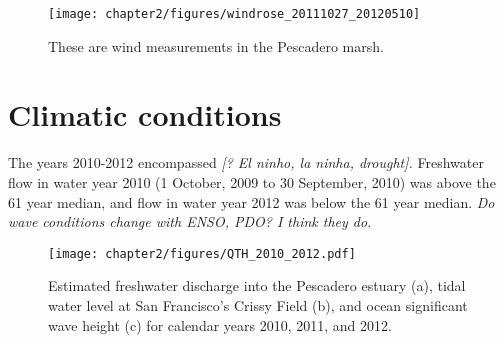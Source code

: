  \begin{figure}
 	\begin{center}
 		\texttt{[image: chapter2/figures/windrose\_20111027\_20120510]} \caption{These are wind measurements in the Pescadero marsh.} \label{fig:metstn_pdo_windrose} 
 	\end{center}
 \end{figure}



% 
% 
\section{Climatic conditions} \label{conditions_label}

The years 2010-2012 encompassed \emph{[? El ninho, la ninha, drought].} Freshwater flow in water year 2010 (1 October, 2009 to 30 September, 2010) was above the 61 year median, and flow in water year 2012 was below the 61 year median. \emph{Do wave conditions change with ENSO, PDO? I think they do}.



\begin{figure}
	\begin{center}
		\texttt{[image: chapter2/figures/QTH\_2010\_2012.pdf]} \caption{Estimated freshwater discharge into the Pescadero estuary (a), tidal water level at San Francisco's Crissy Field (b), and ocean significant wave height (c) for calendar years 2010, 2011, and 2012.}\label{fig:QTH_2010_2012}  
	\end{center}
\end{figure}

